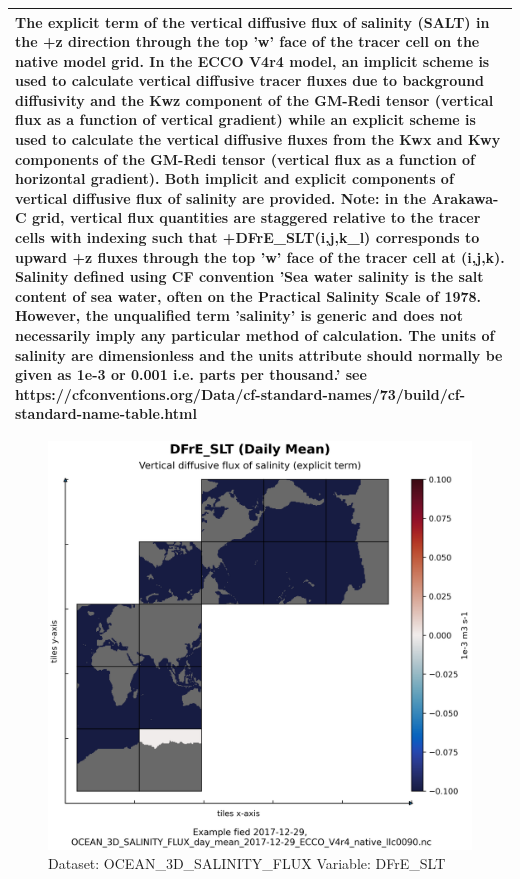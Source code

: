 \begin{longtable}{|m{}|m{}|m{}|m{}|}
\multicolumn{4}{|p{1\textwidth}|}{The explicit term of the vertical diffusive flux of salinity (SALT) in the +z direction through the top 'w' face of the tracer cell on the native model grid. In the ECCO V4r4 model, an implicit scheme is used to calculate vertical diffusive tracer fluxes due to background diffusivity and the Kwz component of the GM-Redi tensor (vertical flux as a function of vertical gradient) while an explicit scheme is used to calculate the vertical diffusive fluxes from the Kwx and Kwy components of the GM-Redi tensor (vertical flux as a function of horizontal gradient). Both implicit and explicit components of vertical diffusive flux of salinity are provided. Note: in the Arakawa-C grid, vertical flux quantities are staggered relative to the tracer cells with indexing such that +DFrE\_SLT(i,j,k\_l) corresponds to upward +z fluxes through the top 'w' face of the tracer cell at (i,j,k). Salinity defined using CF convention 'Sea water salinity is the salt content of sea water, often on the Practical Salinity Scale of 1978. However, the unqualified term 'salinity' is generic and does not necessarily imply any particular method of calculation. The units of salinity are dimensionless and the units attribute should normally be given as 1e-3 or 0.001 i.e. parts per thousand.' see https://cfconventions.org/Data/cf-standard-names/73/build/cf-standard-name-table.html} \\ \hline
\end{longtable}

\begin{figure}[H]
\centering
\includegraphics[scale=0.55]{../images/plots/native_plots/Ocean_Three-Dimensional_Salinity_Fluxes/DFrE_SLT.png}
\caption{Dataset: OCEAN\_3D\_SALINITY\_FLUX Variable: DFrE\_SLT}
\label{tab:table-OCEAN_3D_SALINITY_FLUX_DFrE_SLT-Plot}
\end{figure}
\pagebreak
